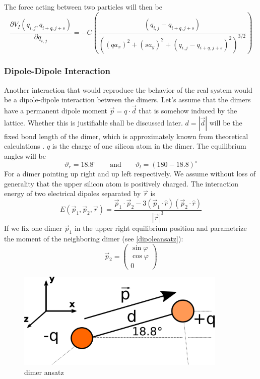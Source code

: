	The force acting between two particles will then be
	\begin{equation}
		\frac{\partial V_I (q_{i,j}, q_{i+q, j+s})}{\partial q_{i, j}} =	- C \left(\frac{(q_{i, j} - q_{i+q, j+s})}{\left((q a_x)^2 + (s a_y)^2 + (q_{i, j} - q_{i+q, j+s})^2\right)^{3/2}}\right)
	\end{equation}
	
	
	\subsubsection{Dipole-Dipole Interaction}
	Another interaction that would reproduce the behavior of the real system would be a dipole-dipole interaction between the dimers. Let's assume that the dimers have a permanent dipole moment $\vec{p} =	q \cdot \vec{d}$ that is somehow induced by the lattice. Whether this is justifiable shall be discussed later. $d =	|\vec{d}|$ will be the fixed bond length of the dimer, which is approximately known from theoretical calculations \cite{ramstad1995theoretical}. $q$ is the charge of one silicon atom in the dimer. The equilibrium angles will be
	\begin{equation}
		\vartheta_{r} =	18.8^\circ \qquad \text{and} \qquad \vartheta_{l} = (180 - 18.8)^\circ
	\end{equation}
	For a dimer pointing up right and up left respectively. We assume without loss of generality that the upper silicon atom is positively charged. The interaction energy of two electrical dipoles separated by $\vec{r}$ is
	\begin{equation}
		E(\vec{p}_1, \vec{p}_2, \vec{r}) =	\frac{\vec{p}_1 \cdot \vec{p}_2 - 3 \left(\vec{p}_1 \cdot \hat{r} \right) \left(\vec{p}_2 \cdot \hat{r}\right)}{|\vec{r}|^3}
	\end{equation}
	If we fix one dimer $\vec{p}_1$ in the upper right equilibrium position and parametrize the moment of the neighboring dimer (see \autoref{dipoleansatz}):
	\begin{equation}
		\vec{p}_2 = \left(\begin{array}{c}
			\sin \varphi \\
			\cos \varphi \\
			0
		\end{array} \right)
	\end{equation}
	\begin{figure}[htb]
		\centering
		\includegraphics[width=10cm]{graphics/dipole-ansatz.png}
		\caption{dimer ansatz}
		\label{dipoleansatz}
	\end{figure}
